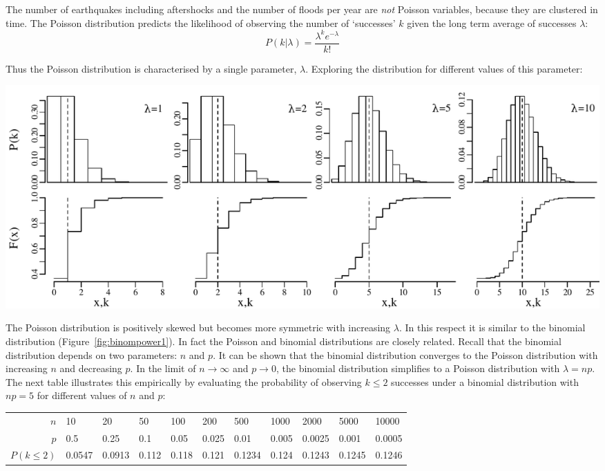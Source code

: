 The number of earthquakes including aftershocks and the number of
floods per year are \emph{not} Poisson variables, because they are
clustered in time. The Poisson distribution predicts the likelihood of
observing the number of `successes' $k$ given the long term average of
successes $\lambda$:
\begin{equation}
  P(k|\lambda) = \frac{\lambda^k e^{-\lambda}}{k!}
  \label{eq:poispmf}
\end{equation}

Thus the Poisson distribution is characterised by a single parameter,
$\lambda$. Exploring the distribution for different values of this
parameter:\medskip

\noindent\includegraphics[width=\textwidth]{../figures/increasinglambda.pdf}
\begingroup {} \endgroup

The Poisson distribution is positively skewed but becomes more
symmetric with increasing $\lambda$. In this respect it is similar to
the binomial distribution (Figure~\ref{fig:binompower1}). In fact the
Poisson and binomial distributions are closely related. Recall that
the binomial distribution depends on two parameters: $n$ and $p$. It
can be shown that the binomial distribution converges to the Poisson
distribution with increasing $n$ and decreasing $p$. In the limit of
$n \rightarrow \infty$ and $p \rightarrow 0$, the binomial
distribution simplifies to a Poisson distribution with $\lambda =
{n}{p}$. The next table illustrates this empirically by evaluating the
probability of observing $k\leq{2}$ successes under a binomial
distribution with $np=5$ for different values of $n$ and $p$:

\begin{center}
\begin{tabular}{r|llllllllll}
$n$ & 10 & 20 & 50 & 100 & 200 & 500 & 1000 & 2000 & 5000 & 10000 \\
$p$ & 0.5 & 0.25 & 0.1 & 0.05 & 0.025 & 0.01 & 0.005 & 0.0025 & 0.001 & 0.0005 \\
$P(k\leq{2})$ & 0.0547 & 0.0913 & 0.112 & 0.118 & 0.121 & 0.1234 & 0.124 & 0.1243 & 0.1245 & 0.1246
\end{tabular}
\end{center}

